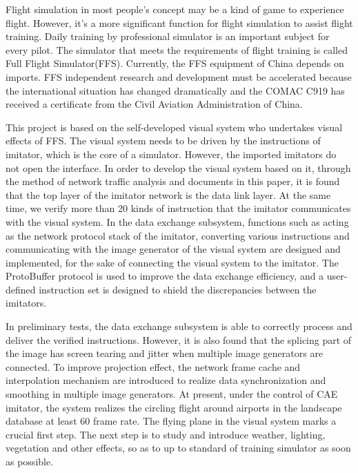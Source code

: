 \documentclass[winfonts,master,oneside]{njuthesis}
\begin{document}
\begin{englishabstract}
	{Flight simulation in most people's concept may be a kind of game to experience flight. 
    However, it's a more significant function for flight simulation to assist flight training. Daily training by professional simulator is an important subject for every pilot.
    The simulator that meets the requirements of flight training is called Full Flight Simulator(FFS).
    Currently, the FFS equipment of China depends on imports. FFS independent research and development must be accelerated because the international situation has changed dramatically and 
    the COMAC C919 has received a certificate from the Civil Aviation Administration of China.
    
    \par
    This project is based on the self-developed visual system who undertakes visual effects of FFS. 
    The visual system needs to be driven by the instructions of imitator, which is the core of a simulator.
    However, the imported imitators do not open the interface. In order to develop the visual system based on it, 
    through the method of network traffic analysis and documents in this paper, it is found that the top layer of the imitator network is the data link layer.
    At the same time, we verify more than 20 kinds of instruction that the imitator communicates with the visual system.
    In the data exchange subsystem, functions such as acting as the network protocol stack of the imitator, converting various instructions and communicating with the image generator of the visual system are designed and implemented, for the sake of connecting the visual system to the imitator.
    The ProtoBuffer protocol is used to improve the data exchange efficiency, and a user-defined instruction set is designed to shield the discrepancies between the imitators.
    \par
    In preliminary tests, the data exchange subsystem is able to correctly process and deliver the verified instructions.
    However, it is also found that the splicing part of the image has screen tearing and jitter when multiple image generators are connected.
    To improve projection effect, the network frame cache and interpolation mechanism are introduced to realize data synchronization and smoothing in multiple image generators.
    At present, under the control of CAE imitator, the system realizes the circling flight around airports in the landscape database at least 60 frame rate. The flying plane in the visual system marks a crucial first step.
    The next step is to study and introduce weather, lighting, vegetation and other effects, so as to up to standard of training simulator as soon as possible.
    }
\end{englishabstract}
\end{document}
